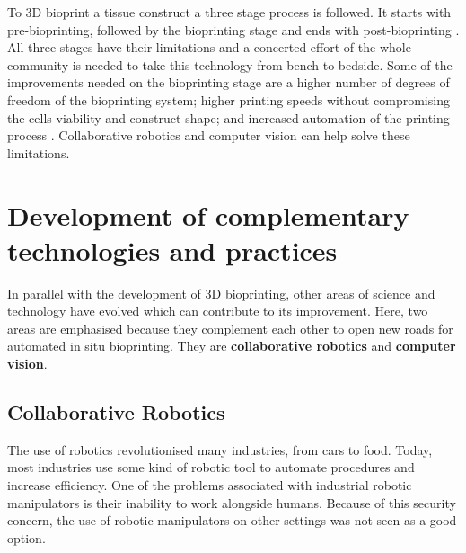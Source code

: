 To 3D bioprint a tissue construct a three stage process is followed. It starts with pre-bioprinting, followed by the bioprinting stage and ends with post-bioprinting \cite{Datta2018_essential_steps_bioprinting, Vijayavenkataraman2018_bioprinting_tissues_organs_regen_med}. All three stages have their limitations and a concerted effort of the whole community is needed to take this technology from bench to bedside. Some of the improvements needed on the bioprinting stage are a higher number of degrees of freedom of the bioprinting system; higher printing speeds without compromising the cells viability and construct shape; and increased automation of the printing process \cite{Ozbolat2017_evaluation_bioprinter_tech, Datta2018_essential_steps_bioprinting}. Collaborative robotics and computer vision can help solve these limitations.


\section{Development of complementary technologies and practices} %
\label{sec:development_of_complementary_technologies_and_practices}

In parallel with the development of 3D bioprinting, other areas of science and technology have evolved which can contribute to its improvement. Here, two areas are emphasised because they complement each other to open new roads for automated in situ bioprinting. They are \textbf{collaborative robotics} and \textbf{computer vision}.

\subsection{Collaborative Robotics} %
\label{subsec:collaborative_robotics}

The use of robotics revolutionised many industries, from cars to food. Today, most industries use some kind of robotic tool to automate procedures and increase efficiency. One of the problems associated with industrial robotic manipulators is their inability to work alongside humans. Because of this security concern, the use of robotic manipulators on other settings was not seen as a good option.


